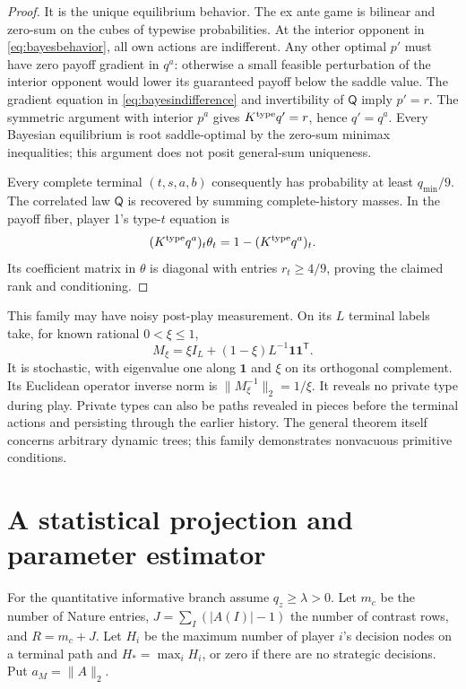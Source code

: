 \documentclass[11pt,a4paper]{article}
\numberwithin{equation}{section}
\theoremstyle{definition}
\begin{document}
\begin{proof}
It is the unique equilibrium behavior. The ex ante game is bilinear
and zero-sum on the cubes of typewise probabilities. At the interior
opponent in \eqref{eq:bayesbehavior}, all own actions are indifferent.
Any other optimal \(p'\) must have zero payoff gradient in \(q^a\):
otherwise a small feasible perturbation of the interior opponent
would lower its guaranteed payoff below the saddle value.
The gradient equation in \eqref{eq:bayesindifference} and invertibility
of \(\mathsf Q\) imply \(p'=r\).
The symmetric argument with interior \(p^a\) gives
\(K^{\rm type}q'=r\), hence \(q'=q^a\).
Every Bayesian equilibrium is root saddle-optimal by the zero-sum
minimax inequalities; this argument does not posit general-sum uniqueness.

Every complete terminal \((t,s,a,b)\) consequently has probability
at least \(q_{\min}/9\). The correlated law \(\mathsf Q\) is recovered
by summing complete-history masses. In the payoff fiber, player 1's
type-\(t\) equation is
\[
 (K^{\rm type}q^a)_t\theta_t
       =1-(K^{\rm type}q^a)_t.
\]
Its coefficient matrix in \(\theta\) is diagonal with entries
\(r_t\ge4/9\), proving the claimed rank and conditioning.
\end{proof}

This family may have noisy post-play measurement. On its \(L\)
terminal labels take, for known rational \(0<\xi\le1\),
\begin{equation}\label{eq:noisychannel}
 M_\xi=\xi I_L+(1-\xi)L^{-1}\mathbf1\mathbf1^{\mathsf T}.
\end{equation}
It is stochastic, with eigenvalue one along \(\mathbf1\) and
\(\xi\) on its orthogonal complement. Its Euclidean operator inverse
norm is \(\|M_\xi^{-1}\|_2=1/\xi\).
It reveals no private type during play. Private types can also be
paths revealed in pieces before the terminal actions and persisting
through the earlier history. The general theorem itself concerns
arbitrary dynamic trees; this family demonstrates nonvacuous primitive
conditions.

\section{A statistical projection and parameter estimator}\label{sec:stats}
For the quantitative informative branch assume \(q_z\ge\lambda>0\).
Let \(m_c\) be the number of Nature entries,
\(J=\sum_I(|A(I)|-1)\) the number of contrast rows, and
\(R=m_c+J\). Let \(H_i\) be the maximum number of player \(i\)'s
decision nodes on a terminal path and \(H_*=\max_iH_i\), or zero
if there are no strategic decisions. Put \(a_M=\|A\|_2\).
\end{document}

